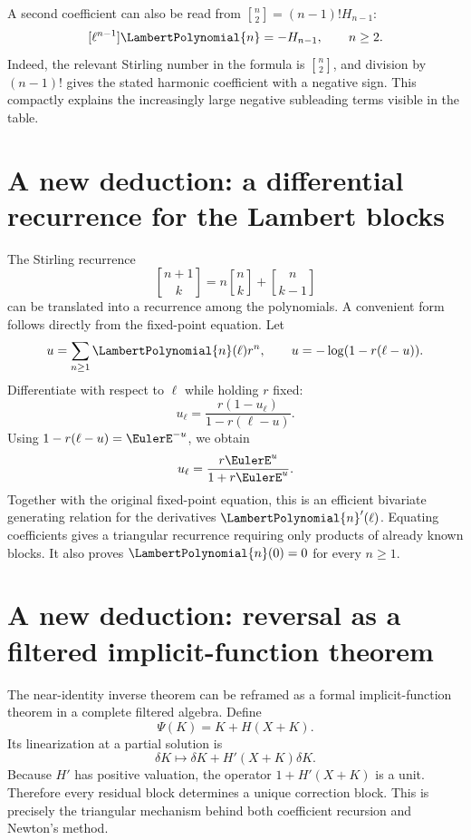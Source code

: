 \documentclass[11pt,openany]{book}
\theoremstyle{definition}
\theoremstyle{plain}
\theoremstyle{remark}
\newcommand{\stirlingone}[2]{\genfrac{[}{]}{0pt}{}{#1}{#2}}
\begin{document}
A second coefficient can also be read from \(\stirlingone{n}{2}=(n-1)!H_{n-1}\):
\begin{equation}\label{eq:Pn-next-leading}
 [\ell^{n-1}]\LambertPolynomial{n}
 =-H_{n-1},
 \qquad n\ge2.
\end{equation}
Indeed, the relevant Stirling number in the formula is \(\stirlingone{n}{2}\), and division by \((n-1)!\) gives the stated harmonic coefficient with a negative sign. This compactly explains the increasingly large negative subleading terms visible in the table.

\section{A new deduction: a differential recurrence for the Lambert blocks}
The Stirling recurrence
\[
 \stirlingone{n+1}{k}=n\stirlingone{n}{k}+\stirlingone{n}{k-1}
\]
can be translated into a recurrence among the polynomials. A convenient form follows directly from the fixed-point equation. Let
\[
 u=\sum_{n\ge1}\LambertPolynomial{n}(\ell)r^n,
 \qquad
 u=-\log(1-r(\ell-u)).
\]
Differentiate with respect to \(\ell\) while holding \(r\) fixed:
\[
 u_\ell=\frac{r(1-u_\ell)}{1-r(\ell-u)}.
\]
Using \(1-r(\ell-u)=\EulerE^{-u}\), we obtain
\begin{equation}\label{eq:Lambert-generating-differential}
 u_\ell=\frac{r\EulerE^u}{1+r\EulerE^u}.
\end{equation}
Together with the original fixed-point equation, this is an efficient bivariate generating relation for the derivatives \(\LambertPolynomial{n}'(\ell)\). Equating coefficients gives a triangular recurrence requiring only products of already known blocks. It also proves \(\LambertPolynomial{n}(0)=0\) for every \(n\ge1\).

\section{A new deduction: reversal as a filtered implicit-function theorem}
The near-identity inverse theorem can be reframed as a formal implicit-function theorem in a complete filtered algebra. Define
\[
 \Psi(K)=K+H(X+K).
\]
Its linearization at a partial solution is
\[
 \delta K\longmapsto \delta K+H'(X+K)\delta K.
\]
Because \(H'\) has positive valuation, the operator \(1+H'(X+K)\) is a unit. Therefore every residual block determines a unique correction block. This is precisely the triangular mechanism behind both coefficient recursion and Newton's method.
\end{document}
